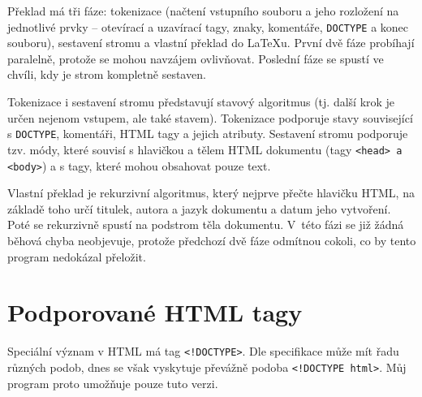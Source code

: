 \documentclass[a4paper,12pt]{article}
\newcommand{\ls}{\textless}
\newcommand{\ps}{\textgreater}
\begin{document}
	Překlad má tři fáze: tokenizace (načtení vstupního souboru a jeho rozložení na jednotlivé prvky -- otevírací a uzavírací tagy, znaky, komentáře, \texttt{DOCTYPE} a konec souboru), sestavení stromu a vlastní překlad do LaTeXu. První dvě fáze probíhají paralelně, protože se mohou navzájem ovlivňovat. Poslední fáze se spustí ve chvíli, kdy je strom kompletně sestaven.
	
	Tokenizace i sestavení stromu představují stavový algoritmus (tj. další krok je určen nejenom vstupem, ale také stavem). Tokenizace podporuje stavy související s \texttt{DOCTYPE}, komentáři, HTML tagy a jejich atributy. Sestavení stromu podporuje tzv. módy, které souvisí s hlavičkou a tělem HTML dokumentu (tagy \texttt{\ls head\ps~a \ls body\ps}) a s tagy, které mohou obsahovat pouze text.
	
	Vlastní překlad je rekurzivní algoritmus, který nejprve přečte hlavičku HTML, na základě toho určí titulek, autora a jazyk dokumentu a datum jeho vytvoření. Poté se rekurzivně spustí na podstrom těla dokumentu. V~této fázi se již žádná běhová chyba neobjevuje, protože předchozí dvě fáze odmítnou cokoli, co by tento program nedokázal přeložit.
	
	\section{Podporované HTML tagy}
	Speciální význam v HTML má tag \texttt{\ls !DOCTYPE\ps}. Dle specifikace může mít řadu různých podob, dnes se však vyskytuje převážně podoba \texttt{\ls !DOCTYPE html\ps}. Můj program proto umožňuje pouze tuto verzi.
	
\end{document}
